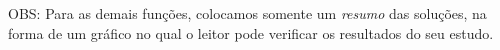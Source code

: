 \begin{Solution}{8.8}
OBS: Para as demais funções, colocamos somente um \emph{resumo} das
soluções, na forma de um gráfico no qual o leitor pode verificar os resultados
do seu estudo.


\end{Solution}
